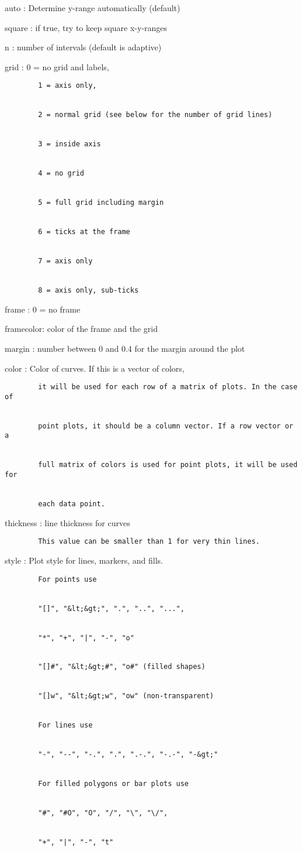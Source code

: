 \documentclass[
]{book}
\begin{document}
auto : Determine y-range automatically (default)

square : if true, try to keep square x-y-ranges

n : number of intervals (default is adaptive)

grid : 0 = no grid and labels,

\begin{verbatim}
        1 = axis only,


        2 = normal grid (see below for the number of grid lines)


        3 = inside axis


        4 = no grid


        5 = full grid including margin


        6 = ticks at the frame


        7 = axis only


        8 = axis only, sub-ticks
\end{verbatim}

frame : 0 = no frame

framecolor: color of the frame and the grid

margin : number between 0 and 0.4 for the margin around the plot

color : Color of curves. If this is a vector of colors,

\begin{verbatim}
        it will be used for each row of a matrix of plots. In the case of


        point plots, it should be a column vector. If a row vector or a


        full matrix of colors is used for point plots, it will be used for


        each data point.
\end{verbatim}

thickness : line thickness for curves

\begin{verbatim}
        This value can be smaller than 1 for very thin lines.
\end{verbatim}

style : Plot style for lines, markers, and fills.

\begin{verbatim}
        For points use


        "[]", "&lt;&gt;", ".", "..", "...",


        "*", "+", "|", "-", "o"


        "[]#", "&lt;&gt;#", "o#" (filled shapes)


        "[]w", "&lt;&gt;w", "ow" (non-transparent)


        For lines use


        "-", "--", "-.", ".", ".-.", "-.-", "-&gt;"


        For filled polygons or bar plots use


        "#", "#O", "O", "/", "\", "\/",


        "+", "|", "-", "t"
\end{verbatim}
\end{document}
